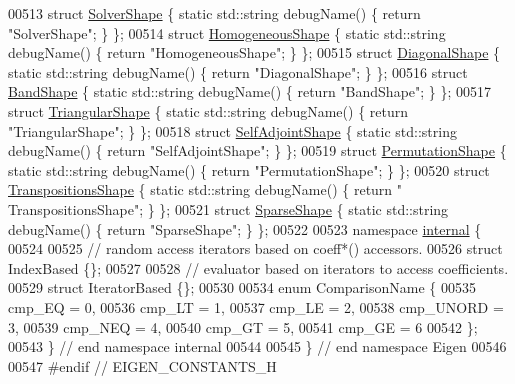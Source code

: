 \begin{DoxyCode}
00513 \textcolor{keyword}{struct }\hyperlink{struct_eigen_1_1_solver_shape}{SolverShape}            \{ \textcolor{keyword}{static} std::string debugName() \{ \textcolor{keywordflow}{return} \textcolor{stringliteral}{"SolverShape"}; \} \};
00514 \textcolor{keyword}{struct }\hyperlink{struct_eigen_1_1_homogeneous_shape}{HomogeneousShape}       \{ \textcolor{keyword}{static} std::string debugName() \{ \textcolor{keywordflow}{return} \textcolor{stringliteral}{"HomogeneousShape"};
       \} \};
00515 \textcolor{keyword}{struct }\hyperlink{struct_eigen_1_1_diagonal_shape}{DiagonalShape}          \{ \textcolor{keyword}{static} std::string debugName() \{ \textcolor{keywordflow}{return} \textcolor{stringliteral}{"DiagonalShape"}; \} \};
00516 \textcolor{keyword}{struct }\hyperlink{struct_eigen_1_1_band_shape}{BandShape}              \{ \textcolor{keyword}{static} std::string debugName() \{ \textcolor{keywordflow}{return} \textcolor{stringliteral}{"BandShape"}; \} \};
00517 \textcolor{keyword}{struct }\hyperlink{struct_eigen_1_1_triangular_shape}{TriangularShape}        \{ \textcolor{keyword}{static} std::string debugName() \{ \textcolor{keywordflow}{return} \textcolor{stringliteral}{"TriangularShape"}; \}
       \};
00518 \textcolor{keyword}{struct }\hyperlink{struct_eigen_1_1_self_adjoint_shape}{SelfAdjointShape}       \{ \textcolor{keyword}{static} std::string debugName() \{ \textcolor{keywordflow}{return} \textcolor{stringliteral}{"SelfAdjointShape"};
       \} \};
00519 \textcolor{keyword}{struct }\hyperlink{struct_eigen_1_1_permutation_shape}{PermutationShape}       \{ \textcolor{keyword}{static} std::string debugName() \{ \textcolor{keywordflow}{return} \textcolor{stringliteral}{"PermutationShape"};
       \} \};
00520 \textcolor{keyword}{struct }\hyperlink{struct_eigen_1_1_transpositions_shape}{TranspositionsShape}    \{ \textcolor{keyword}{static} std::string debugName() \{ \textcolor{keywordflow}{return} \textcolor{stringliteral}{"
      TranspositionsShape"}; \} \};
00521 \textcolor{keyword}{struct }\hyperlink{struct_eigen_1_1_sparse_shape}{SparseShape}            \{ \textcolor{keyword}{static} std::string debugName() \{ \textcolor{keywordflow}{return} \textcolor{stringliteral}{"SparseShape"}; \} \};
00522 
00523 \textcolor{keyword}{namespace }\hyperlink{namespaceinternal}{internal} \{
00524 
00525   \textcolor{comment}{// random access iterators based on coeff*() accessors.}
00526 \textcolor{keyword}{struct }IndexBased \{\};
00527 
00528 \textcolor{comment}{// evaluator based on iterators to access coefficients. }
00529 \textcolor{keyword}{struct }IteratorBased \{\};
00530 
00534 \textcolor{keyword}{enum} ComparisonName \{
00535   cmp\_EQ = 0,
00536   cmp\_LT = 1,
00537   cmp\_LE = 2,
00538   cmp\_UNORD = 3,
00539   cmp\_NEQ = 4,
00540   cmp\_GT = 5,
00541   cmp\_GE = 6
00542 \};
00543 \} \textcolor{comment}{// end namespace internal}
00544 
00545 \} \textcolor{comment}{// end namespace Eigen}
00546 
00547 \textcolor{preprocessor}{#endif // EIGEN\_CONSTANTS\_H}
\end{DoxyCode}
